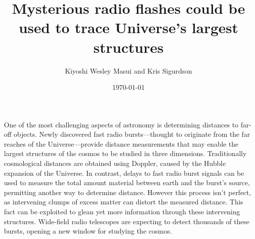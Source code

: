 \documentclass{article}
\title{Mysterious radio flashes could be used to trace Universe's largest
structures}
\date{\today}
\author{Kiyoshi Wesley Masui and Kris Sigurdson}
\begin{document}
\maketitle

One of the most challenging aspects of astronomy is determining distances to
far-off objects. Newly discovered fast radio bursts---thought to originate from
the far reaches of the Universe---provide distance measurements that may
enable the largest structures of the cosmos to be studied in three dimensions.
Traditionally cosmological distances are obtained using Doppler, caused
by the Hubble expansion of the Universe. In contrast, delays to fast radio
burst signals can be used to measure the total amount material between earth
and the burst's source, permitting another way to determine distance.  However
this process isn't perfect, as intervening clumps of excess matter can distort the
measured distance. This fact can be exploited to glean yet more
information through these intervening structures.  Wide-field radio telescopes
are expecting to detect thousands of these bursts, opening a new window for
studying the cosmos.
\end{document}
